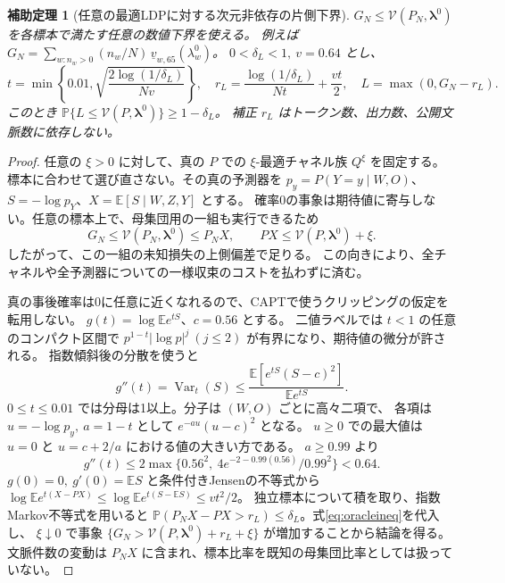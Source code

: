 \documentclass[a4paper,11pt]{ltjsarticle}
\theoremstyle{jp}
\newtheorem{lem}[thm]{補助定理}
\newcommand{\E}{\mathbb E}
\newcommand{\PP}{\mathbb P}
\begin{document}
\begin{lem}[任意の最適LDPに対する次元非依存の片側下界]\label{th:oracle}
\(G_N\le\mathcal V(P_N,\boldsymbol\lambda^0)\) を各標本で満たす任意の数値下界を使える。
例えば \(G_N=\sum_{w:n_w>0}(n_w/N)\,\underline v_{w,65}(\lambda_w^0)\)。
\(0<\delta_L<1,\ v=0.64\) とし、
\[
 t=\min\!\left\{0.01,\sqrt{\frac{2\log(1/\delta_L)}{Nv}}\right\},\quad
 r_L=\frac{\log(1/\delta_L)}{Nt}+\frac{vt}{2},\quad L=\max(0,G_N-r_L).
 \tag{8}\label{eq:lcb}
\]
このとき \(\PP\{L\le\mathcal V(P,\boldsymbol\lambda^0)\}\ge1-\delta_L\)。
補正 \(r_L\) はトークン数、出力数、公開文脈数に依存しない。
\end{lem}
\begin{proof}
任意の \(\xi>0\) に対して、真の \(P\) での \(\xi\)-最適チャネル族 \(Q^\xi\) を固定する。
標本に合わせて選び直さない。その真の予測器を
\(p_y=P(Y=y\mid W,O)\)、\(S=-\log p_Y\)、\(X=\E[S\mid W,Z,Y]\) とする。
確率0の事象は期待値に寄与しない。任意の標本上で、母集団用の一組も実行できるため
\[
 G_N\le\mathcal V(P_N,\boldsymbol\lambda^0)\le P_NX,\qquad
 PX\le\mathcal V(P,\boldsymbol\lambda^0)+\xi .
 \tag{9}\label{eq:oracleineq}
\]
したがって、この一組の未知損失の上側偏差で足りる。
この向きにより、全チャネルや全予測器についての一様収束のコストを払わずに済む。

真の事後確率は0に任意に近くなれるので、CAPTで使うクリッピングの仮定を転用しない。
\(g(t)=\log\E e^{tS}\)、\(c=0.56\) とする。
二値ラベルでは \(t<1\) の任意のコンパクト区間で \(p^{1-t}|\log p|^j\ (j\le2)\)
が有界になり、期待値の微分が許される。
指数傾斜後の分散を使うと
\[
 g''(t)=\operatorname{Var}_t(S)
 \le \frac{\E[e^{tS}(S-c)^2]}{\E e^{tS}} .
\]
\(0\le t\le0.01\) では分母は1以上。分子は \((W,O)\) ごとに高々二項で、
各項は \(u=-\log p_y,\ a=1-t\) として \(e^{-au}(u-c)^2\) となる。
\(u\ge0\) での最大値は \(u=0\) と \(u=c+2/a\) における値の大きい方である。
\(a\ge0.99\) より
\[
 g''(t)\le2\max\{0.56^2,\ 4e^{-2-0.99(0.56)}/0.99^2\}<0.64 .
\]
\(g(0)=0,\ g'(0)=\E S\) と条件付きJensenの不等式から
\(\log\E e^{t(X-PX)}\le\log\E e^{t(S-\E S)}\le vt^2/2\)。
独立標本について積を取り、指数Markov不等式を用いると
\(\PP(P_NX-PX>r_L)\le\delta_L\)。式\eqref{eq:oracleineq}を代入し、
\(\xi\downarrow0\) で事象 \(\{G_N>\mathcal V(P,\boldsymbol\lambda^0)+r_L+\xi\}\)
が増加することから結論を得る。
文脈件数の変動は \(P_NX\) に含まれ、標本比率を既知の母集団比率としては扱っていない。
\end{proof}
\end{document}
